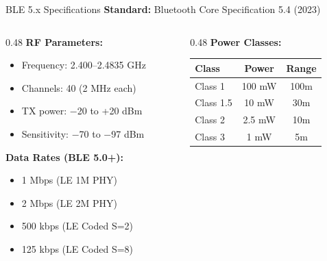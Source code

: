 \documentclass[aspectratio=169,11pt]{beamer}
\begin{document}
\begin{frame}{BLE 5.x Specifications}
    \textbf{Standard:} Bluetooth Core Specification 5.4 (2023)
    
    \vspace{0.3cm}
    \begin{columns}[T]
        \begin{column}{0.48\textwidth}
            \textbf{RF Parameters:}
            \begin{itemize}
                \item Frequency: 2.400--2.4835 GHz
                \item Channels: 40 (2 MHz each)
                \item TX power: $-$20 to +20 dBm
                \item Sensitivity: $-$70 to $-$97 dBm
            \end{itemize}
            
            \vspace{0.2cm}
            \textbf{Data Rates (BLE 5.0+):}
            \begin{itemize}
                \item 1 Mbps (LE 1M PHY)
                \item 2 Mbps (LE 2M PHY)
                \item 500 kbps (LE Coded S=2)
                \item 125 kbps (LE Coded S=8)
            \end{itemize}
        \end{column}
        \begin{column}{0.48\textwidth}
            \textbf{Power Classes:}
            \begin{table}
                \centering
                \footnotesize
                \begin{tabular}{@{}lcc@{}}
                    \toprule
                    \textbf{Class} & \textbf{Power} & \textbf{Range} \\
                    \midrule
                    Class 1 & 100 mW & 100m \\
                    Class 1.5 & 10 mW & 30m \\
                    Class 2 & 2.5 mW & 10m \\
                    Class 3 & 1 mW & 5m \\
                    \bottomrule
                \end{tabular}
            \end{table}
            

\end{column}
\end{columns}
\end{frame}
\end{document}
